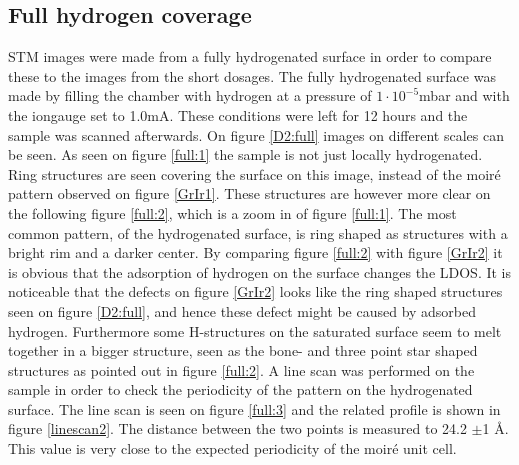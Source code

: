 \subsection{Full hydrogen coverage}
STM images were made from a fully hydrogenated surface in order to compare these to the images from the short dosages. The fully hydrogenated surface was made by filling the chamber with hydrogen at a pressure of $1 \cdot 10^{-5}$mbar and with the iongauge set to 1.0mA. These conditions were left for 12 hours and the sample was scanned afterwards. On figure \ref{D2:full} images on different scales can be seen. As seen on figure \ref{full:1} the sample is not just locally hydrogenated. Ring structures are seen covering the surface on this image, instead of the moiré pattern observed on figure \ref{GrIr1}. These structures are however more clear on the following figure \ref{full:2}, which is a zoom in of figure \ref{full:1}. The most common pattern, of the hydrogenated surface, is ring shaped as structures with a bright rim and a darker center. By comparing figure \ref{full:2} with figure \ref{GrIr2} it is obvious that the adsorption of hydrogen on the surface changes the LDOS. It is noticeable that the defects on figure \ref{GrIr2} looks like the ring shaped structures seen on figure \ref{D2:full}, and hence these defect might be caused by adsorbed hydrogen. Furthermore some H-structures on the saturated surface seem to melt together in a bigger structure, seen as the bone- and three point star shaped structures as pointed out in figure \ref{full:2}.
A line scan was performed on the sample in order to check the periodicity of the pattern on the hydrogenated surface. The line scan is seen on figure \ref{full:3} and the related profile is shown in figure \ref{linescan2}. The distance between the two points is measured to 24.2 $\pm$1 Å. This value is very close to the expected periodicity of the moiré unit cell.\cite{1367-2630-11-2-023006}\\

